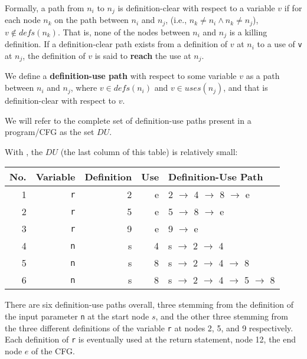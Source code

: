 Formally, a path from $n_i$ to $n_j$ is definition-clear with respect to a
variable $v$ if for each node $n_k$ on the path between $n_i$ and $n_j$, (i.e.,
$n_k \neq n_i \wedge n_k \neq n_j$), $v \notin \mathit{defs}(n_k)$. That is,
none of the nodes between $n_i$ and $n_j$ is a killing definition. 
%
If a definition-clear path exists from a definition of $v$ at $n_i$ to a
use of {\tt v} at $n_j$, the definition of $v$ is said to {\bf reach} the use
at $n_j$.


We define a {\bf definition-use path} with respect to some variable $v$ as a
path between $n_i$ and $n_j$, where $v \in \mathit{defs}(n_i)$ and $v \in
\mathit{uses}(n_j)$, and that is definition-clear with respect to $v$.

We will refer to the complete set of definition-use paths present in a
program/CFG as the set $\mathit{DU}$. 


With \signmethod, the $DU$ (the last column of this table) is relatively small:

\begin{center}
\begin{tabular}{rrrrl}
    \toprule
    No. & Variable & Definition & Use & Definition-Use Path \\
    \midrule
    1 & {\tt r}  &          2 &   e & 2 $\rightarrow$ 4 $\rightarrow$ 8 $\rightarrow$ e \\
    2 & {\tt r}  &          5 &   e & 5 $\rightarrow$ 8 $\rightarrow$ e \\
    3 & {\tt r}  &          9 &   e & 9 $\rightarrow$ e \\
    4 & {\tt n}  &          s &   4 & s $\rightarrow$ 2 $\rightarrow$ 4 \\
    5 & {\tt n}  &          s &   8 & s $\rightarrow$ 2 $\rightarrow$ 4 $\rightarrow$ 8 \\
    6 & {\tt n}  &          s &   8 & s $\rightarrow$ 2 $\rightarrow$ 4 $\rightarrow$ 5 $\rightarrow$ 8 \\
    \bottomrule
\end{tabular}
\end{center}

There are six definition-use paths overall, three stemming from the definition of the
input parameter {\tt n} at the start node $s$, and the other three stemming from
the three different definitions of the variable {\tt r} at nodes 2, 5, and 9
respectively. Each definition of {\tt r} is eventually used at the return
statement, node 12, the end node $e$ of the CFG.

